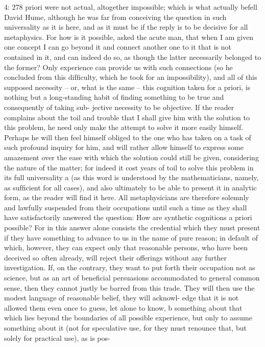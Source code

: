 4: 278
priori were not actual, altogether impossible; which is what actually befell
David Hume, although he was far from conceiving the question in such
universality as it is here, and as it must be if the reply is to be decisive for
all metaphysics. For how is it possible, asked the acute man, that when
I am given one concept I can go beyond it and connect another one to
it that is not contained in it, and can indeed do so, as though the latter
necessarily belonged to the former? Only experience can provide us with
such connections (so he concluded from this difﬁculty, which he took
for an impossibility), and all of this supposed necessity – or, what is the
same – this cognition taken for a priori, is nothing but a long-standing
habit of ﬁnding something to be true and consequently of taking sub-
jective necessity to be objective.
If the reader complains about the toil and trouble that I shall give
him with the solution to this problem, he need only make the attempt
to solve it more easily himself. Perhaps he will then feel himself obliged
to the one who has taken on a task of such profound inquiry for him,
and will rather allow himself to express some amazement over the ease
with which the solution could still be given, considering the nature of
the matter; for indeed it cost years of toil to solve this problem in its full
universality a (as this word is understood by the mathematicians, namely,
as sufﬁcient for all cases), and also ultimately to be able to present it in
analytic form, as the reader will ﬁnd it here.
All metaphysicians are therefore solemnly and lawfully suspended
from their occupations until such a time as they shall have satisfactorily
answered the question: How are synthetic cognitions a priori possible? For in
this answer alone consists the credential which they must present if they
have something to advance to us in the name of pure reason; in default
of which, however, they can expect only that reasonable persons, who
have been deceived so often already, will reject their offerings without
any further investigation.
If, on the contrary, they want to put forth their occupation not as
science, but as an art of beneﬁcial persuasions accommodated to general
common sense, then they cannot justly be barred from this trade. They
will then use the modest language of reasonable belief, they will acknowl-
edge that it is not allowed them even once to guess, let alone to know, b
something about that which lies beyond the boundaries of all possible
experience, but only to assume something about it (not for speculative
use, for they must renounce that, but solely for practical use), as is pos-
